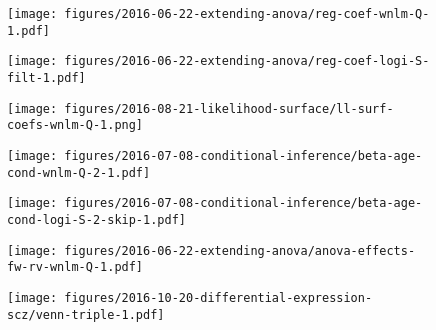 \documentclass[letterpaper]{article}
\begin{document}
\begin{figure}
\begin{center}
\texttt{[image: figures/2016-06-22-extending-anova/reg-coef-wnlm-Q-1.pdf]}
\end{center}
\caption{}
\label{fig:all-effects-wnlm.Q}
\end{figure}

\begin{figure}
\begin{center}
\texttt{[image: figures/2016-06-22-extending-anova/reg-coef-logi-S-filt-1.pdf]}
\end{center}
\caption{}
\label{fig:all-effects-logi.S}
\end{figure}

\begin{figure}
\begin{center}
\texttt{[image: figures/2016-08-21-likelihood-surface/ll-surf-coefs-wnlm-Q-1.png]}
\end{center}
\caption{}
\label{fig:ll-non-orthogonality}
\end{figure}

\begin{figure}
\begin{center}
\texttt{[image: figures/2016-07-08-conditional-inference/beta-age-cond-wnlm-Q-2-1.pdf]}
\end{center}
\caption{}
\label{fig:interaction-wnlm.Q}
\end{figure}

\begin{figure}
\begin{center}
\texttt{[image: figures/2016-07-08-conditional-inference/beta-age-cond-logi-S-2-skip-1.pdf]}
\end{center}
\caption{}
\label{fig:interaction-logi.S}
\end{figure}

\begin{figure}
\begin{center}
\texttt{[image: figures/2016-06-22-extending-anova/anova-effects-fw-rv-wnlm-Q-1.pdf]}
\end{center}
\caption{}
\label{fig:anova}
\end{figure}

\begin{figure}
\begin{center}
\texttt{[image: figures/2016-10-20-differential-expression-scz/venn-triple-1.pdf]}
\end{center}
\caption{}
\label{fig:diff-exp-scz}
\end{figure}



\setcounter{table}{0}
\makeatletter 
\renewcommand{\thetable}{S\@arabic\c@table}
\makeatother
\end{document}

